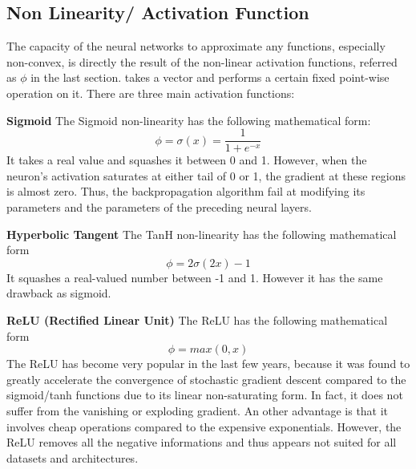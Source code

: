     \subsection{Non Linearity/ Activation Function}
    The capacity of the neural networks to approximate any functions, especially non-convex, is directly the result of the non-linear activation functions, referred as $\phi$ in the last section.  takes a vector and performs a certain fixed point-wise operation on it. There are three main activation functions:
    \vspace{5mm}
    \par \noindent
    \textbf{Sigmoid} The Sigmoid non-linearity has the following mathematical form:
    \begin{equation*}
        \phi=\sigma(x)=\frac{1}{1+e^{-x}}
    \end{equation*}
        It takes a real value and squashes it between 0 and 1. However, when the neuron's activation saturates at either tail of 0 or 1, the gradient at these regions is almost zero. Thus, the backpropagation algorithm fail at modifying its parameters and the parameters of the preceding neural layers.
    \vspace{5mm} \par \noindent
    \textbf{Hyperbolic Tangent} The TanH non-linearity has the following mathematical form
      \begin{equation*}
        \phi=2\sigma(2x)-1
    \end{equation*}
        It squashes a real-valued number between -1 and 1. However it has the same drawback as sigmoid.
    
    \vspace{5mm} \par \noindent
    \textbf{ReLU (Rectified Linear Unit)} The ReLU has the following mathematical form
    \begin{equation*}
        \phi=max(0,x)
    \end{equation*}
        The ReLU has become very popular in the last few years, because it was found to greatly
        accelerate the convergence of stochastic gradient descent compared to the sigmoid/tanh
        functions due to its linear non-saturating form. In fact, it does not suffer from the vanishing or exploding gradient. An other advantage is that it involves cheap operations compared to the expensive exponentials. However, the ReLU
        removes all the negative informations and thus appears not suited for all datasets and architectures.
    
